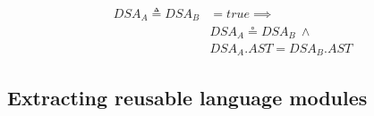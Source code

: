 \begin{itemize}
\begin{equation}
\begin{split}
  DSA_{A} \triangleq DSA_{B} & = true \implies \\
   & DSA_{A} \circeq DSA_{B} ~ \wedge \\
   & DSA_{A}.AST = DSA_{B}.AST
 \end{split}
\end{equation}
\end{itemize}




\subsection{Extracting reusable language modules}

